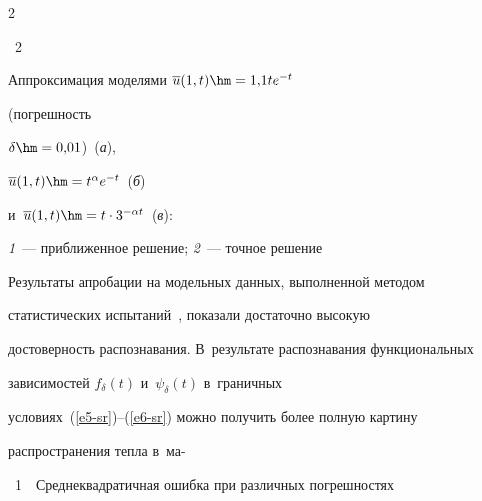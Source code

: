 \begin{multicols}{2}
{\noindent

{{\figurename~2}\ \ \small{Аппроксимация моделями $\overline{u}(1,t)\hm=1{,}1 te^{-t}$ 

(погрешность 

$\delta\hm=0{,}01$)~(\textit{а}),

$\overline{u}(1,t)\hm=t^\alpha e^{-t}$~(\textit{б}) 

и~$\overline{u}(1,t)\hm=t\cdot 3^{-\alpha t}$~(\textit{в}): 

\textit{1}~--- приближенное решение; \textit{2}~--- точное решение}}

}



\vspace*{12pt}



\addtocounter{figure}{1}



  Результаты апробации на модельных данных, выполненной методом 

статистических испытаний~\cite{16-sr, 17-sr}, показали достаточно высокую 

достоверность распознавания. В~результате распознавания функциональных 

зависимостей $f_\delta(t)$ и~$\psi_\delta(t)$ в~граничных  

условиях~(\ref{e5-sr})--(\ref{e6-sr}) можно получить более полную картину 

распространения тепла в~ма-\linebreak\vspace*{-12pt}






\begin{center}



\noindent

\parbox{174pt}{{{\tablename~1}\ \ \small{Среднеквадратичная ошибка при различных погрешностях}}

}



\vspace*{6pt}



{\small

\begin{tabular}{|c|c|}

\hline


\end{tabular}}
\end{center}
\end{multicols}
